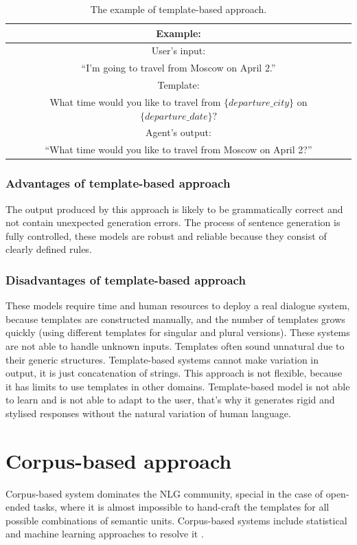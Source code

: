   \begin{table}[t]
  \centering
   \begin{tabular}{|c|} 
   \hline
   Example: \\
   \hline
   User's input: \\
   ``I'm going to travel from Moscow on April 2.'' \\ 
   \hline
   Template: \\
   What time would you like to travel from $\{departure\_city\}$ on $\{departure\_date\}?$ \\
   \hline
   Agent's output:\\
   ``What time would you like to travel from Moscow on April 2?'' \\
   \hline
   \end{tabular}
   \caption{The example of template-based approach.}
  \label{tab:tb_example}
  \end{table}

\subsubsection{Advantages of template-based approach}
The output produced by this approach is likely to be grammatically correct and not contain unexpected generation errors. The process of sentence generation is fully controlled, these models are robust and reliable because they consist of clearly defined rules. 

\subsubsection{Disadvantages of template-based approach}
These models require time and human resources to deploy a real dialogue system, because templates are constructed manually, and the number of templates grows quickly (using different templates for singular and plural versions). These systems are not able to handle unknown inputs. Templates often sound unnatural due to their generic structures. Template-based systems cannot make variation in output, it is just concatenation of strings. This approach is not flexible, because it has limits to use templates in other domains. Template-based model is not able to learn and is not able to adapt to the user, that's why it generates rigid and stylised responses without the natural variation of human language.

\section{Corpus-based approach}
Corpus-based system dominates the NLG community, special in the case of open-ended tasks, where it is almost impossible to hand-craft the templates for all possible combinations of semantic units. Corpus-based systems include statistical and machine learning approaches to resolve it \cite{rudnicky2002dialog}.

